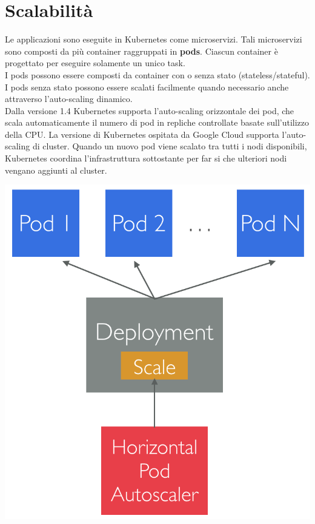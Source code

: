 \documentclass[12pt, a4paper]{report}
\begin{document}
\section{Scalabilità}
Le applicazioni sono eseguite in Kubernetes come microservizi. Tali microservizi sono composti da più container raggruppati in \textbf{pods}. Ciascun container è progettato per eseguire solamente un unico task.\\
I pods possono essere composti da container con o senza stato (stateless/stateful). I pods senza stato possono essere scalati facilmente quando necessario anche attraverso l'auto-scaling dinamico.\\
Dalla versione 1.4 Kubernetes supporta l'auto-scaling orizzontale dei pod, che scala automaticamente il numero di pod in repliche controllate basate sull'utilizzo della CPU. La versione di Kubernetes ospitata da Google Cloud supporta l'auto-scaling di cluster. Quando un nuovo pod viene scalato tra tutti i nodi disponibili, Kubernetes coordina l'infrastruttura sottostante per far si che ulteriori nodi vengano aggiunti al cluster. \\
  \begin{center}
  \includegraphics[scale = 0.6]{Images/HorizontalAutoscaler}
  \end{center}
\end{document}
